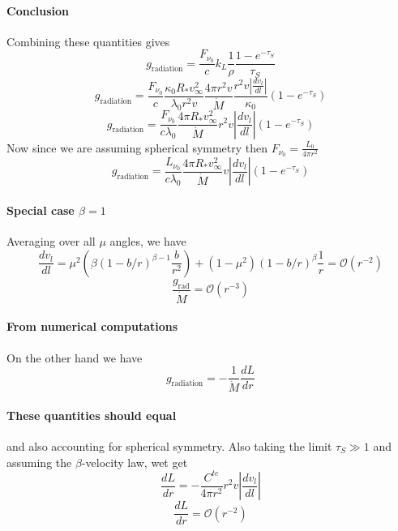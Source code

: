 \documentclass[../main/main.tex]{subfiles}
\begin{document}
\paragraph{Conclusion}
Combining these quantities gives
\begin{equation}
g_{\text{radiation}} = \frac{F_{\nu_0}}{c}  k_L \frac{1}{\rho }\frac{1- e^{-\tau_S}}{\tau_S}  
\end{equation}
\begin{equation}
g_{\text{radiation}} = 
\frac{F_{\nu_0}}{c} 
\frac{\kappa_0 R_* v_{\infty}^2}{\lambda_0 r^2 v} 
\frac{4 \pi r^2 v}{\dot{M}}  
\frac{r^2 v \left | \frac{dv_l}{dl} \right| }{\kappa_0} \left( 1- e^{-\tau_S} \right)
\end{equation}
\begin{equation}
\boxed{g_{\text{radiation}} = 
\frac{F_{\nu_0}}{c \lambda_0} 
\frac{4 \pi R_* v_{\infty}^2}{ \dot{M}} 
r^2 v \left | \frac{dv_l}{dl} \right|  \left( 1- e^{-\tau_S} \right)}
\end{equation}
Now since we are assuming spherical symmetry then $F_{\nu_0} = \frac{L_{0}}{4 \pi r^2 }$
\begin{equation}
\boxed{g_{\text{radiation}} = 
\frac{L_{\nu_0}}{c \lambda_0} 
\frac{4 \pi R_* v_{\infty}^2} {\dot{M}} 
v \left | \frac{dv_l}{dl} \right|  \left( 1- e^{-\tau_S} \right)}
\end{equation}
\paragraph{Special case $\beta= 1$}
Averaging over all $\mu$ angles, we have 
\begin{equation}
\frac{dv_l}{dl} = \mu^2 \left( \beta(1-b/r)^{\beta-1} \frac{b}{r^2} \right) + (1-\mu^2) (1-b/r)^{\beta} \frac{1}{r}  = \mathcal{O}(r^{-2})
\end{equation}
\begin{equation}
\frac{g_{\text{rad}}}{\dot{M}} = \mathcal{O}(r^{-3})
\end{equation}

\paragraph{From numerical computations}
On the other hand we have
\begin{equation}
\boxed{g_{\text{radiation}} = - \frac{1}{\dot{M}}\frac{dL}{dr}}
\end{equation}

\paragraph{These quantities should equal} and also accounting for spherical symmetry. Also taking the limit $\tau_S \gg 1$ and assuming the $\beta$-velocity law, wet get
\begin{equation}
\frac{dL}{dr} = -\frac{C^{te}}{4 \pi r^2} r^2 v 
\left| \frac{dv_l}{dl} \right|
\end{equation}
\begin{equation}
\frac{dL}{dr} = \mathcal{O}(r^{-2})
\label{scaling_relation}
\end{equation}
\end{document}
